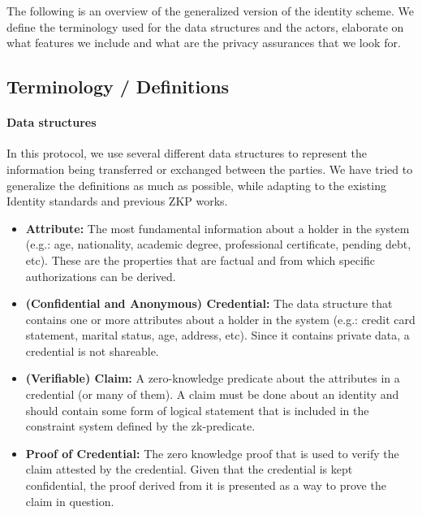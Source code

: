 The following is an overview of the generalized version of the identity scheme. We define the terminology used for the data structures and the actors, elaborate on what features we include and what are the privacy assurances that we look for. 


\subsection{Terminology / Definitions}
\label{sec:apps:id-framework:terminology}


\paragraph{Data structures}
In this protocol, we use several different data structures to represent the information being transferred or exchanged between the parties. 
We have tried to generalize the definitions as much as possible, while adapting to the existing Identity standards and previous ZKP works.
\loosen

\begin{itemize}
    \item \textbf{Attribute:} The most fundamental information about a holder in the system (e.g.: age, nationality, academic degree, professional certificate, pending debt, etc).
    These are the properties that are factual and from which specific authorizations can be derived.

    \item \textbf{(Confidential and Anonymous) Credential:} The data structure that contains one or more attributes about a holder in the system (e.g.: credit card statement, marital status, age, address, etc). 
    Since it contains private data, a credential is not shareable. 

    \item \textbf{(Verifiable) Claim:} A zero-knowledge predicate about the attributes in a credential (or many of them). 
    A claim must be done about an identity and should contain some form of logical statement that is included in the constraint system defined by the zk-predicate. 

    \item \textbf{Proof of Credential:} The zero knowledge proof that is used to verify the claim attested by the credential. 
    Given that the credential is kept confidential, the proof derived from it is presented as a way to prove the claim in question.

\end{itemize}

